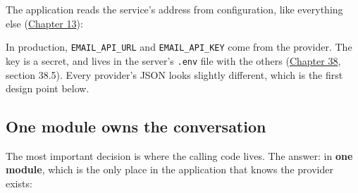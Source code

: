 \noindent{}The application reads the service's address from configuration, like everything else (\hyperref[ch:13-configuration-externalization]{Chapter 13}):

\begin{codebox}[short]

\begin{Shaded}
\begin{Highlighting}[]
 \OperatorTok{=}\NormalTok{, }\NormalTok{)}
 \OperatorTok{=}\NormalTok{, }\NormalTok{)  }
 \OperatorTok{=}\NormalTok{, }\NormalTok{)}
\end{Highlighting}
\end{Shaded}

\end{codebox}

\noindent{}In production, \texttt{EMAIL\_API\_URL} and \texttt{EMAIL\_API\_KEY} come from the provider. The key is a secret, and lives in the server's \texttt{.env} file with the others (\hyperref[ch:38-security]{Chapter 38}, section 38.5). Every provider's JSON looks slightly different, which is the first design point below.

\subsection*{One module owns the conversation}\label{37-reliability:one-module-owns-the-conversation}

The most important decision is where the calling code lives. The answer: in \textbf{one module}, which is the only place in the application that knows the provider exists:

